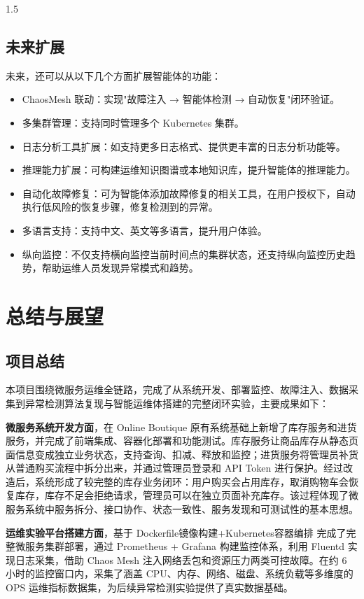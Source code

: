 \documentclass[a4paper,12pt]{report}
\begin{document}
\begin{spacing}{1.5}
\subsection{未来扩展}
未来，还可以从以下几个方面扩展智能体的功能：
\begin{itemize}
	\item ChaosMesh 联动：实现"故障注入 → 智能体检测 → 自动恢复"闭环验证。
	\item 多集群管理：支持同时管理多个 Kubernetes 集群。
	\item 日志分析工具扩展：如支持更多日志格式、提供更丰富的日志分析功能等。
	\item 推理能力扩展：可构建运维知识图谱或本地知识库，提升智能体的推理能力。
	\item 自动化故障修复：可为智能体添加故障修复的相关工具，在用户授权下，自动执行低风险的恢复步骤，修复检测到的异常。
	\item 多语言支持：支持中文、英文等多语言，提升用户体验。
	\item 纵向监控：不仅支持横向监控当前时间点的集群状态，还支持纵向监控历史趋势，帮助运维人员发现异常模式和趋势。
\end{itemize}

\section{总结与展望}
\subsection{项目总结}
本项目围绕微服务运维全链路，完成了从系统开发、部署监控、故障注入、数据采集到异常检测算法复现与智能运维体搭建的完整闭环实验，主要成果如下：

\textbf{微服务系统开发方面}，在 Online Boutique 原有系统基础上新增了库存服务和进货服务，并完成了前端集成、容器化部署和功能测试。库存服务让商品库存从静态页面信息变成独立业务状态，支持查询、扣减、释放和监控；进货服务将管理员补货从普通购买流程中拆分出来，并通过管理员登录和 API Token 进行保护。经过改造后，系统形成了较完整的库存业务闭环：用户购买会占用库存，取消购物车会恢复库存，库存不足会拒绝请求，管理员可以在独立页面补充库存。该过程体现了微服务系统中服务拆分、接口协作、状态一致性、服务发现和可测试性的基本思想。

\textbf{运维实验平台搭建方面}，基于 Dockerfile镜像构建+Kubernetes容器编排 完成了完整微服务集群部署，通过 Prometheus + Grafana 构建监控体系，利用 Fluentd 实现日志采集，借助 Chaos Mesh 注入网络丢包和资源压力两类可控故障。在约 6 小时的监控窗口内，采集了涵盖 CPU、内存、网络、磁盘、系统负载等多维度的 OPS 运维指标数据集，为后续异常检测实验提供了真实数据基础。


\end{spacing}
\end{document}

